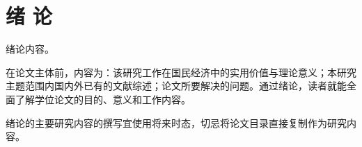 \chapter{绪 论}

	绪论内容。
	
	在论文主体前，内容为：该研究工作在国民经济中的实用价值与理论意义；本研究主题范围内国内外已有的文献综述；论文所要解决的问题。通过绪论，读者就能全面了解学位论文的目的、意义和工作内容。

    绪论的主要研究内容的撰写宜使用将来时态，切忌将论文目录直接复制作为研究内容。